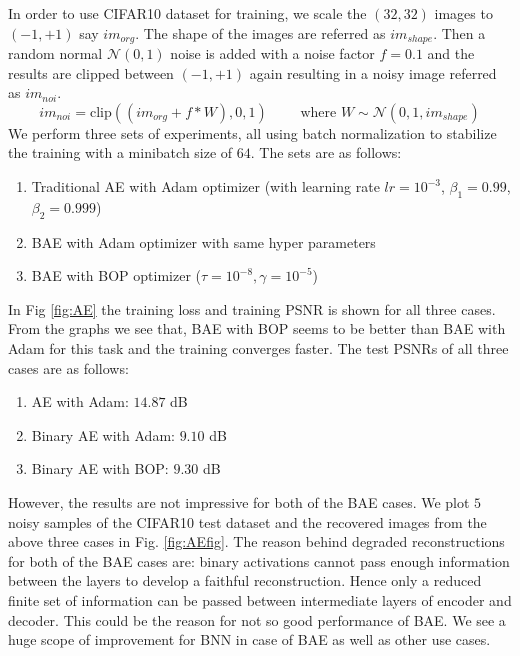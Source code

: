 In order to use CIFAR10 dataset for training, we scale the $(32,32)$ images to $(-1,+1)$ say $im_{org}$. The shape of the images are referred as $im_{shape}$. Then a random normal $\mathcal{N}(0,1)$ noise is added with a noise factor $f = 0.1$ and the results are clipped between $(-1,+1)$ again resulting in a noisy image referred as $im_{noi}$.
\begin{equation}
    im_{noi} = \text{clip}\left((im_{org}+f* W), 0, 1\right) \qquad \text{ where } W \sim \mathcal{N}(0,1, im_{shape})
\end{equation}
We perform three sets of experiments, all using batch normalization to stabilize the training with a minibatch size of $64$. The sets are as follows:
\begin{enumerate}
    \item Traditional AE with Adam optimizer (with learning rate $lr = 10^{-3}$, $\beta_1 = 0.99$, $\beta_2 = 0.999$)
    \item BAE with Adam optimizer with same hyper parameters
    \item BAE with BOP optimizer ($\tau=10^{-8}, \gamma=10^{-5}$)
\end{enumerate}
In Fig \ref{fig:AE} the training loss and training PSNR is shown for all three cases. From the graphs we see that, BAE with BOP seems to be better than BAE with Adam for this task and the training converges faster. The test PSNRs of all three cases are as follows:
\begin{enumerate}
    \item AE with Adam: $14.87$ dB
    \item Binary AE with Adam: $9.10$ dB
    \item Binary AE with BOP: $9.30$ dB
\end{enumerate}
However, the results are not impressive for both of the BAE cases. We plot $5$ noisy samples of the CIFAR10 test dataset and the recovered images from the above three cases in Fig. \ref{fig:AEfig}. The reason behind degraded reconstructions for both of the BAE cases are: binary activations cannot pass enough information between the layers to develop a faithful reconstruction. Hence only a reduced finite set of information can be passed between intermediate layers of encoder and decoder. This could be the reason for not so good performance of BAE. We see a huge scope of improvement for BNN in case of BAE as well as other use cases.
